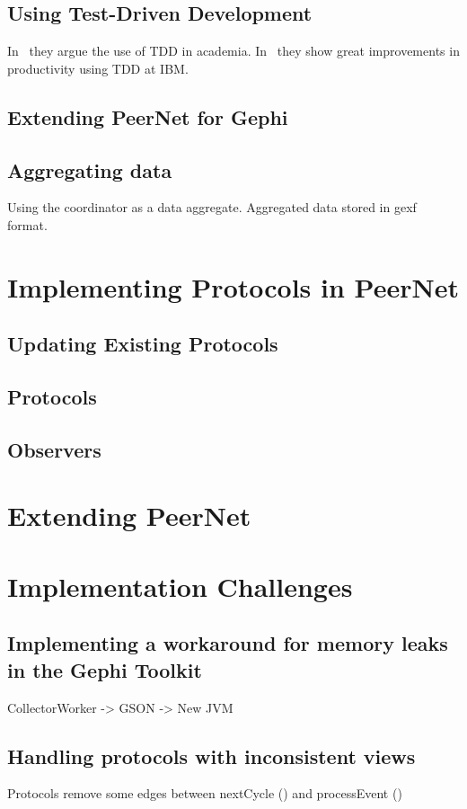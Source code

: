 \documentclass[UKenglish, a4paper]{ifimaster}
\begin{document}
        \subsection{Using Test-Driven Development}
        In~\cite{janzen2005test} they argue the use of TDD in academia.
        In~\cite{maximilien2003assessing} they show great improvements
        in productivity using TDD at IBM.\
        \subsection{Extending PeerNet for Gephi}
        \subsection{Aggregating data}
            Using the coordinator as a data aggregate. Aggregated data
            stored in gexf format.
    \section{Implementing Protocols in PeerNet}
        \subsection{Updating Existing Protocols}
        \subsection{Protocols}
        \subsection{Observers}
    \section{Extending PeerNet}
    \section{Implementation Challenges}
    \subsection{Implementing a workaround for memory leaks in the Gephi Toolkit}
    CollectorWorker -> GSON -> New JVM
    \subsection{Handling protocols with inconsistent views}
    Protocols remove some edges between nextCycle () and processEvent ()
\end{document}
